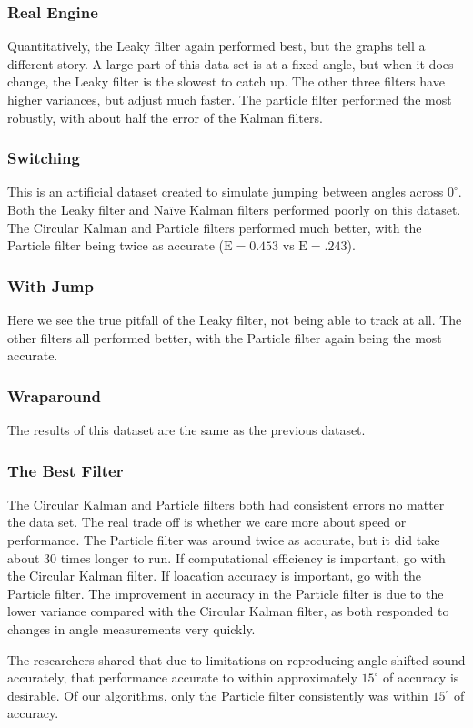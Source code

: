 \documentclass[11pt]{amsart}
\begin{document}
\subsubsection{Real Engine}
Quantitatively, the Leaky filter again performed best, but the graphs tell a different story. A large part of this data set is at a fixed angle, but when it does change, the Leaky filter is the slowest to catch up. The other three filters have higher variances, but adjust much faster. The particle filter performed the most robustly, with about half the error of the Kalman filters.
\subsubsection{Switching}
This is an artificial dataset created to simulate jumping between angles across $0^{\circ}$. Both the Leaky filter and Naïve Kalman filters performed poorly on this dataset. The Circular Kalman and Particle filters performed much better, with the Particle filter being twice as accurate ($\mathrm{E}=0.453$ vs $\mathrm{E}=.243$).
\subsubsection{With Jump}
Here we see the true pitfall of the Leaky filter, not being able to track at all. The other filters all performed better, with the Particle filter again being the most accurate.
\subsubsection{Wraparound}
The results of this dataset are the same as the previous dataset.
\subsubsection{The Best Filter}
The Circular Kalman and Particle filters both had consistent errors no matter the data set. The real trade off is whether we care more about speed or performance. The Particle filter was around twice as accurate, but it did take about 30 times longer to run. If computational efficiency is important, go with the Circular Kalman filter. If loacation accuracy is important, go with the Particle filter. The improvement in accuracy in the Particle filter is due to the lower variance compared with the Circular Kalman filter, as both responded to changes in angle measurements very quickly.

The researchers shared that due to limitations on reproducing angle-shifted sound accurately, that performance accurate to within approximately $15^{\circ}$ of accuracy is desirable. Of our algorithms, only the Particle filter consistently was within $15^{\circ}$ of accuracy.
\end{document}
